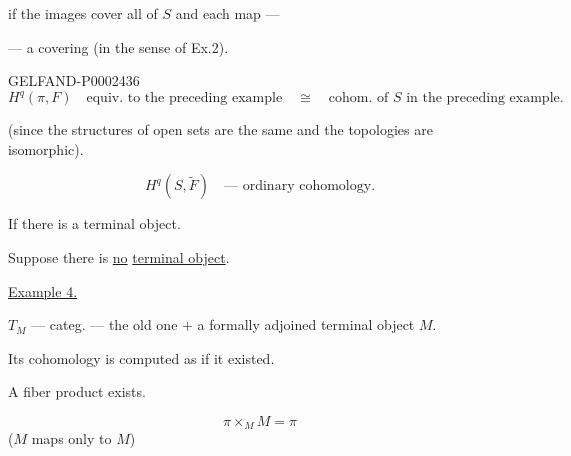 if the images cover all of $S$ and each map —

— a covering (in the sense of Ex.2).



\begin{GelfandAdjacentEvidence}{GELFAND-P000243}{6}
\begin{equation*}
H^q (\pi, F)\quad\text{equiv. to the preceding example}\quad\cong\quad\text{cohom. of $S$ in the preceding example.}
\end{equation*}



(since the structures of open sets are the same and the topologies are isomorphic).





\begin{equation*}H^q (S,\widetilde F)\quad\text{— ordinary cohomology.}\end{equation*}
\end{GelfandAdjacentEvidence}



If there is a terminal object.



Suppose there is \underline{no} \underline{terminal object}.



\underline{\underline{Example 4.}}



$T_M$ — categ. — the old one $+$ a formally adjoined terminal object $M$.



Its cohomology is computed as if it existed.



A fiber product exists.



\begin{equation*}\pi\times_M M=\pi\end{equation*}
($M$ maps only to $M$)



